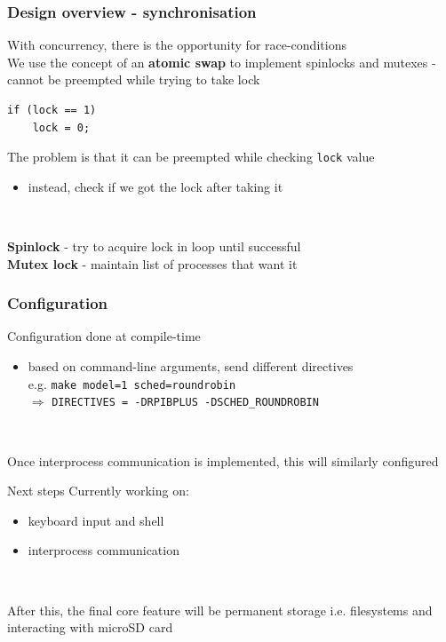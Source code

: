 \documentclass[10pt]{beamer}
\newcommand{\code}[1]{\texttt{#1}}
\begin{document}
\begin{frame}[fragile]
    \frametitle{Design overview - synchronisation}
    With concurrency, there is the opportunity for race-conditions \\

    We use the concept of an \textbf{atomic swap} to implement spinlocks and
    mutexes - cannot be preempted while trying to take lock

    \lstset{language=C,basicstyle=\ttfamily}
    \begin{lstlisting}
if (lock == 1)
    lock = 0;
    \end{lstlisting}

    The problem is that it can be preempted while checking \code{lock} value
    \begin{itemize}
        \item instead, check if we got the lock after taking it
    \end{itemize} ~

    \textbf{Spinlock} - try to acquire lock in loop until successful \\
    \textbf{Mutex lock} - maintain list of processes that want it
\end{frame}

\begin{frame}[fragile]
    \frametitle{Configuration}
    Configuration done at compile-time
    \begin{itemize}
        \item based on command-line arguments, send different directives \\
        e.g. \code{make model=1 sched=roundrobin} \\
        $\Rightarrow$ \code{DIRECTIVES = -DRPIBPLUS -DSCHED\_ROUNDROBIN}
    \end{itemize} ~

    Once interprocess communication is implemented, this will similarly
    configured
\end{frame}

\begin{frame}{Next steps}
    Currently working on:
    \begin{itemize}
        \item keyboard input and shell
        \item interprocess communication
    \end{itemize} ~

    After this, the final core feature will be permanent storage i.e.
    filesystems and interacting with microSD card
\end{frame}
\end{document}
